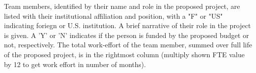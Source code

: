
\newenvironment{[INSERTFILENAME]}{%
\addtocounter{table}{\TaskAddCounter}
\renewcommand{\arraystretch}{\SpaceBetweenRows}  %
\setlength{\tabcolsep}{\SpaceBetweenColumns}     %
\begin{longtable}{T}

\caption{\TableTitle \label{\TableLabel}}
\multicolumn{5}{l}{\textbf{Program \#:} \ProgramId}\\
\multicolumn{5}{l}{\textbf{Program Admin PI:} \AdminPIname}\\
\multicolumn{5}{l}{\textbf{Science PI:} \SciencePIname}\\

\LabelBoldface{\cellcolor{\HeaderColor}\color{\LabelColor}Contributor} & 
\LabelBoldface{\cellcolor{\HeaderColor}\color{\LabelColor}Position} \newline{\LabelBoldface{\cellcolor{\HeaderColor}\color{\LabelColor}Institution} \newline{\LabelBoldface{\cellcolor{\HeaderColor}\color{\LabelColor}US/Foreign}}} &
\LabelBoldface{\cellcolor{\HeaderColor}\color{\LabelColor}Role} & 
\LabelBoldface{\cellcolor{\HeaderColor}\color{\LabelColor}\$?} & 
\LabelBoldface{\cellcolor{\HeaderColor}\color{\LabelColor}FTE}\\
\hline\hline
[INSERTTABLECONTENT]
\hline

[STARTROWTEMPLATE]
[INSERTNAME] & [INSERTJOB] & [INSERTDESC] & [INSERTFUNDING] & [INSERTFTE]\hline
[ENDROWTEMPLATE]

}
{%
\end{longtable}
}


\begin{tablenotes}[flushleft] Team members, identified by their name and role in the proposed project, are listed with their institutional affiliation and position, with a "F" or "US" indicating foriegn or U.S. institution.  A brief narrative of their role in the project is given.  A 'Y' or 'N' indicates if the person is funded by the proposed budget or not, respectively.  The total work-effort of the team member, summed over full life of the proposed  project, is in the rightmost column (multiply shown FTE value by 12 to get work effort in number of months). 
\end{tablenotes}
